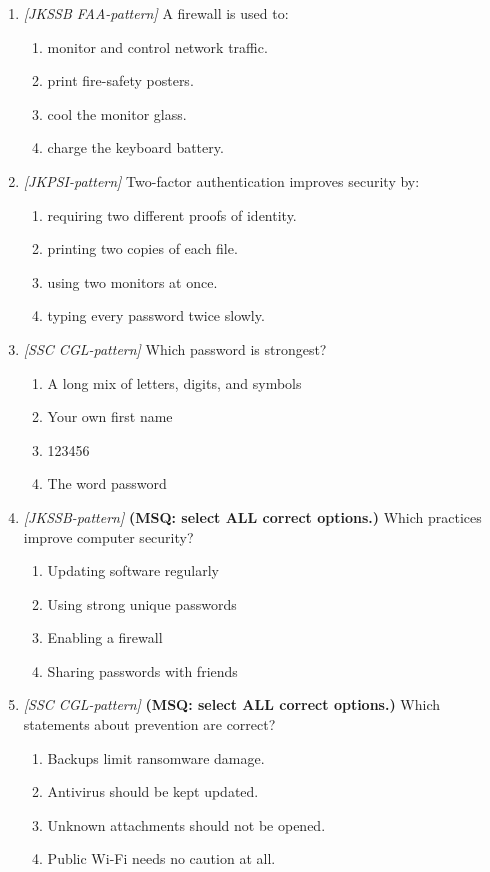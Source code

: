\documentclass[11pt]{article}
\begin{document}
\begin{enumerate}[label=\textbf{Q\arabic*.}, leftmargin=*]
\item \textit{[JKSSB FAA-pattern]} A firewall is used to:
  \begin{enumerate}[label=\Alph*.]
    \item monitor and control network traffic.
    \item print fire-safety posters.
    \item cool the monitor glass.
    \item charge the keyboard battery.
  \end{enumerate}
\item \textit{[JKPSI-pattern]} Two-factor authentication improves security by:
  \begin{enumerate}[label=\Alph*.]
    \item requiring two different proofs of identity.
    \item printing two copies of each file.
    \item using two monitors at once.
    \item typing every password twice slowly.
  \end{enumerate}
\item \textit{[SSC CGL-pattern]} Which password is strongest?
  \begin{enumerate}[label=\Alph*.]
    \item A long mix of letters, digits, and symbols
    \item Your own first name
    \item 123456
    \item The word password
  \end{enumerate}
\item \textit{[JKSSB-pattern]} \textbf{(MSQ: select ALL correct options.)} Which practices improve computer security?
  \begin{enumerate}[label=\Alph*.]
    \item Updating software regularly
    \item Using strong unique passwords
    \item Enabling a firewall
    \item Sharing passwords with friends
  \end{enumerate}
\item \textit{[SSC CGL-pattern]} \textbf{(MSQ: select ALL correct options.)} Which statements about prevention are correct?
  \begin{enumerate}[label=\Alph*.]
    \item Backups limit ransomware damage.
    \item Antivirus should be kept updated.
    \item Unknown attachments should not be opened.
    \item Public Wi-Fi needs no caution at all.
  \end{enumerate}
\end{enumerate}
\def\JKSSBLessonID{44}\def\JKSSBAnswers{0}
\end{document}
